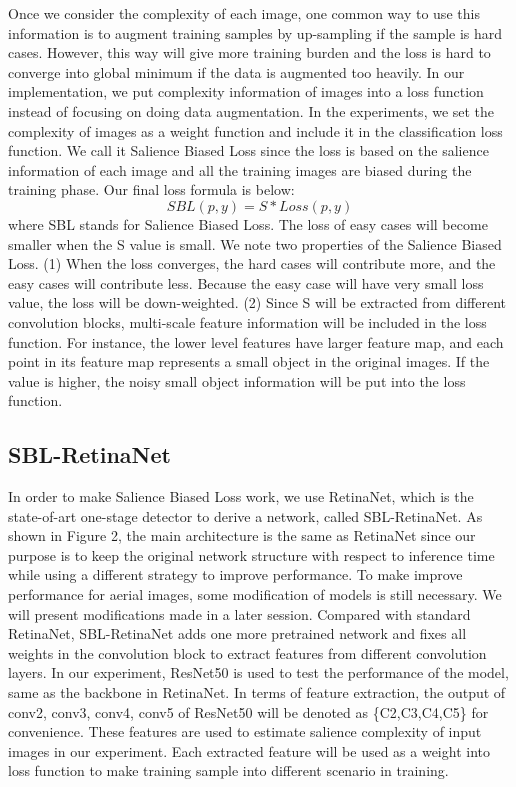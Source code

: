 \documentclass[conference]{IEEEtran}
\begin{document}
    Once we consider the complexity of each image, one common way to use this information is to augment training samples by up-sampling if the sample is hard cases. However, this way will give more training burden and the loss is hard to converge into global minimum if the data is augmented too heavily. In our implementation, we put complexity information of images into a loss function instead of focusing on doing data augmentation. In the experiments, we set the complexity of images as a weight function and include it in the classification loss function. We call it Salience Biased Loss since the loss is based on the salience information of each image and all the training images are biased during the training phase. Our final loss formula is below:
	\begin{equation}
		SBL(p,y)=S*Loss(p,y)
    \end{equation}	
    where SBL stands for Salience Biased Loss. The loss of easy cases will become smaller when the S value is small. We note two properties of the Salience Biased Loss. (1) When the loss converges, the hard cases will contribute more, and the easy cases will contribute less. Because the easy case will have very small loss value, the loss will be down-weighted. (2) Since S will be extracted from different convolution blocks, multi-scale feature information will be included in the loss function. For instance, the lower level features have larger feature map, and each point in its feature map represents a small object in the original images. If the value is higher, the noisy small object information will be put into the loss function. 

	
    \subsection{SBL-RetinaNet}
	In order to make Salience Biased Loss work, we use RetinaNet\cite{lin2017focal}, which is the state-of-art one-stage detector to derive a network, called SBL-RetinaNet. As shown in Figure 2, the main architecture is the same as RetinaNet since our purpose is to keep the original network structure with respect to inference time while using a different strategy to improve performance. To make improve performance for aerial images, some modification of models is still necessary. We will present modifications made in a later session. Compared with standard RetinaNet, SBL-RetinaNet adds one more pretrained network and fixes all weights in the convolution block to extract features from different convolution layers. In our experiment, ResNet50\cite{he2016deep} is used to test the performance of the model, same as the backbone in RetinaNet\cite{lin2017focal}. In terms of feature extraction, the output of conv2, conv3, conv4, conv5 of ResNet50 will be denoted as \{C2,C3,C4,C5\} for convenience. These features are used to estimate salience complexity of input images in our experiment. Each extracted feature will be used as a weight into loss function to make training sample into different scenario in training.
\end{document}
